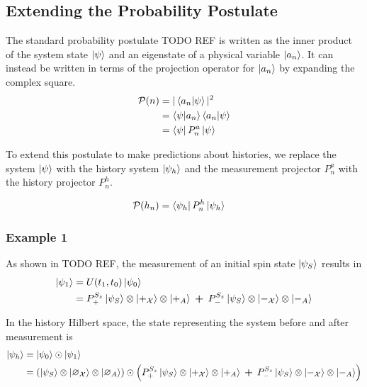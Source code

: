 \subsection{Extending the Probability Postulate}
The standard probability postulate TODO REF is written as the inner product of the system state $\ket{\psi}$ and an eigenstate of a physical variable $\ket{a_n}$. It can instead be written in terms of the projection operator for $\ket{a_n}$ by expanding the complex square.
\begin{align}
        \mathcal{P}(n) &= |\braket{a_n|\psi}|^2 \\ \nonumber
        &= \braket{\psi|a_n} \braket{a_n|\psi} \\ \nonumber
        &= \bra{\psi} P^a_n \ket{\psi}
\end{align}

To extend this postulate to make predictions about histories, we replace the system $\ket{\psi}$ with the history system $\ket{\psi_h}$ and the measurement projector $P^a_n$ with the history projector $P^h_n$.

\begin{align}
    \mathcal{P}(h_n) &= \bra{\psi_h} P^h_n \ket{\psi_h}
\end{align}

\subsubsection{Example 1}

As shown in TODO REF, the measurement of an initial spin state $\ket{\psi_S}$ results in
\begin{align}
  \ket{{\psi}_1} &= U(t_1, t_0)\ket{{\psi}_0} \\ \nonumber
  &= P^{S_z}_+ \ket{\psi_S} \otimes \ket{+_\mathcal{X}} \otimes \ket{+_A}\: \bm{+} \: P^{S_z}_- \ket{\psi_S} \otimes \ket{-_\mathcal{X}} \otimes \ket{-_A}
\end{align}

In the history Hilbert space, the state representing the system before and after measurement is
\begin{align}
  \ket{\psi_h} &= \ket{\psi_0} \odot \ket{\psi_1} \\ \nonumber
  &= \left(\ket{\psi_S} \otimes \ket{\varnothing_\mathcal{X}} \otimes \ket{\varnothing_A} \right) \odot \left(P^{S_z}_+ \ket{\psi_S} \otimes \ket{+_\mathcal{X}} \otimes \ket{+_A} \: \bm{+} \: P^{S_z}_- \ket{\psi_S} \otimes \ket{-_\mathcal{X}} \otimes \ket{-_A} \right)
\end{align}

